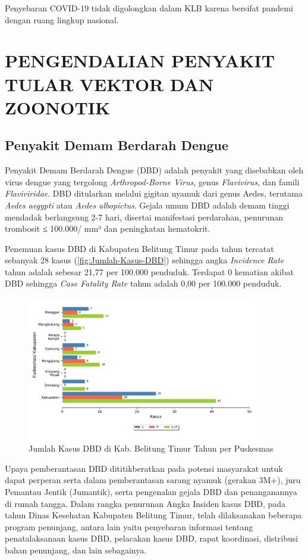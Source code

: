 Penyebaran COVID-19 tidak digolongkan dalam KLB karena bersifat pandemi dengan ruang lingkup nasional.

\section[PENGENDALIAN PTVZ]{PENGENDALIAN PENYAKIT TULAR VEKTOR DAN ZOONOTIK}
\subsection{Penyakit Demam Berdarah Dengue}
Penyakit Demam Berdarah Dengue (DBD) adalah penyakit yang disebabkan oleh virus dengue yang tergolong \emph{Arthropod-Borne Virus}, genus \emph{Flavivirus}, dan famili \emph{Flaviviridae}.
DBD ditularkan melalui gigitan nyamuk dari genus Aedes, terutama \emph{Aedes aegypti} atau \emph{Aedes albopictus}.
Gejala umum DBD adalah demam tinggi mendadak berlangsung 2-7 hari, disertai manifestasi perdarahan, penurunan trombosit ≤ 100.000/ mm³ dan peningkatan hematokrit.

Penemuan kasus DBD di Kabupaten Belitung Timur pada tahun \tP tercatat sebanyak 28 kasus (\autoref{fig:Jumlah-Kasus-DBD}) sehingga angka \emph{Incidence Rate} tahun \tP adalah sebesar 21,77 per 100.000 penduduk.
Terdapat 0 kematian akibat DBD sehingga \emph{Case Fatality Rate} tahun \tP adalah 0,00 per 100.000 penduduk.

\begin{figure}[H]
  \centering
  \includegraphics[width=0.9\textwidth]{bab_06/bab_06_10_DBD}
  \caption{Jumlah Kasus DBD di Kab. Belitung Timur Tahun \tP per Puskesmas}
  \label{fig:Jumlah-Kasus-DBD}
\end{figure}

Upaya pemberantasan DBD dititikberatkan pada potensi masyarakat untuk dapat perperan serta dalam pemberantasan sarang nyamuk (gerakan 3M+), juru Pemantau Jentik (Jumantik), serta pengenalan gejala DBD dan penanganannya di rumah tangga.
Dalam rangka penurunan Angka Insiden kasus DBD, pada tahun \tP Dinas Kesehatan Kabupaten Belitung Timur, telah dilaksanakan beberapa program penunjang, antara lain yaitu penyebaran informasi tentang penatalaksanaan kasus DBD, pelacakan kasus DBD, rapat koordinasi, distribusi bahan penunjang, dan lain sebagainya.

